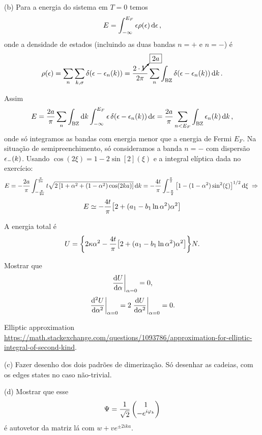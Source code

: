 \documentclass[a4paper,10pt]{article}
\begin{document}
(b) Para a energia do sistema em $T = 0$ temos
$$
E = \int_{-\infty}^{E_F} \epsilon \rho(\epsilon) \dd{\epsilon},
$$
onde a densidade de estados (incluindo as duas bandas $n = +$ e $n = -$) é
$$
\rho(\epsilon) = \sum_{n} \sum_{k, \sigma} \delta(\epsilon - \epsilon_n(k)) =
\frac{2 \cdot \cancelto{\boxed{2a}}{V}}{2\pi}
\sum_{n} \int_{\text{BZ}} \delta(\epsilon - \epsilon_n(k)) \dd{k}.
$$

Assim
$$
E = \frac{2a}{\pi} \sum_{n} \int_{\text{BZ}} \dd{k}
\int_{-\infty}^{E_F} \epsilon \, \delta(\epsilon - \epsilon_n(k)) \dd{\epsilon} =
\frac{2a}{\pi} \sum_{n < E_F} \int_{\text{BZ}} \epsilon_n(k) \dd{k},
$$
onde só integramos as bandas com energia menor que a energia de Fermi $E_F$. Na situação de semipreenchimento, só consideramos a banda $n=-$ com dispersão $\epsilon_-(k)$. Usando $\cos(2\xi) = 1 - 2 \sin[2](\xi)$ e a integral elíptica dada no exercício:
$$
E = - \frac{2a}{\pi} \int_{-\frac{\pi}{2a}}^{\frac{\pi}{2a}}
t \sqrt{2 \, \qty[1 + \alpha^2 + (1-\alpha^2) \cos(2ka)]} \dd{k} =
- \frac{4t}{\pi} \int_{-\frac{\pi}{2}}^{\frac{\pi}{2}}
\qty[1 - (1-\alpha^2) \sin[2](\xi)]^{1/2} \dd{\xi} \; \Rightarrow \;
$$
$$
E \simeq -\frac{4t}{\pi}
\qty[2 + (a_1 - b_1 \ln \alpha^2) \alpha^2]
$$

A energia total é
$$
U =
\qty{2\kappa \alpha^2 -\frac{4t}{\pi}
\qty[2 + (a_1 - b_1 \ln \alpha^2) \alpha^2]} N.
$$

Mostrar que
$$
\eval{\dv{U}{\alpha}}_{\alpha=0} = 0,
$$
$$
\eval{\dv[2]{U}{\alpha}}_{\alpha=0} =
2 \eval{\dv{U}{\alpha^2}}_{\alpha=0}
= 0.
$$

Elliptic approximation \url{https://math.stackexchange.com/questions/1093786/approximation-for-elliptic-integral-of-second-kind}.

\n\n

(c) Fazer desenho dos dois padrões de dimerização. Só desenhar as cadeias, com os edges states no caso não-trivial.

\n\n

(d) Mostrar que esse
$$
\Psi = \frac{1}{\sqrt{2}} \begin{pmatrix}
1 \\ -e^{i\varphi_k}
\end{pmatrix}
$$
é autovetor da matriz lá com $w + ve^{\pm 2ika}$.
\end{document}
